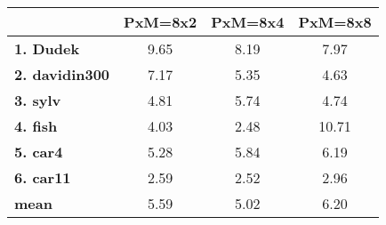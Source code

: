 \begin{tabular}{|l|c|c|c|}
\hline
&\textbf{PxM=8x2}&\textbf{PxM=8x4}&\textbf{PxM=8x8}\\\hline
\textbf{1. Dudek}&9.65&8.19&7.97\\\hline
\textbf{2. davidin300}&7.17&5.35&4.63\\\hline
\textbf{3. sylv}&4.81&5.74&4.74\\\hline
\textbf{4. fish}&4.03&2.48&10.71\\\hline
\textbf{5. car4}&5.28&5.84&6.19\\\hline
\textbf{6. car11}&2.59&2.52&2.96\\\hline
\textbf{mean}&5.59&5.02&6.20\\\hline
\end{tabular}

